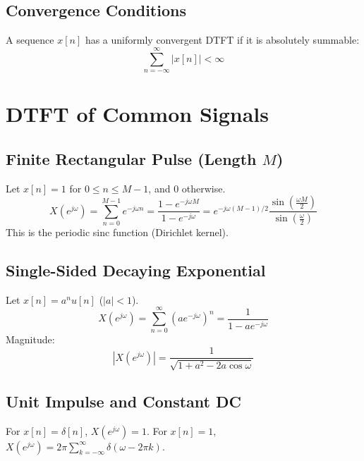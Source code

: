\documentclass[11pt,a4paper]{article}
\begin{document}
\subsection{Convergence Conditions}
A sequence $x[n]$ has a uniformly convergent DTFT if it is absolutely summable:
\begin{equation}
\sum_{n=-\infty}^{\infty} |x[n]| < \infty
\end{equation}

\section{DTFT of Common Signals}
\subsection{Finite Rectangular Pulse (Length $M$)}
Let $x[n] = 1$ for $0 \le n \le M-1$, and $0$ otherwise.
\begin{equation}
X(e^{j\omega}) = \sum_{n=0}^{M-1} e^{-j\omega n} = \frac{1 - e^{-j\omega M}}{1 - e^{-j\omega}} = e^{-j\omega(M-1)/2} \frac{\sin\left(\frac{\omega M}{2}\right)}{\sin\left(\frac{\omega}{2}\right)}
\end{equation}
This is the periodic sinc function (Dirichlet kernel).

\subsection{Single-Sided Decaying Exponential}
Let $x[n] = a^n u[n]$ ($|a| < 1$).
\begin{equation}
X(e^{j\omega}) = \sum_{n=0}^{\infty} \left( a e^{-j\omega} \right)^n = \frac{1}{1 - a e^{-j\omega}}
\end{equation}
Magnitude:
\begin{equation}
|X(e^{j\omega})| = \frac{1}{\sqrt{1 + a^2 - 2a\cos\omega}}
\end{equation}

\subsection{Unit Impulse and Constant DC}
For $x[n] = \delta[n]$, $X(e^{j\omega}) = 1$.  
For $x[n] = 1$, $X(e^{j\omega}) = 2\pi \sum_{k=-\infty}^{\infty} \delta(\omega - 2\pi k)$.
\end{document}
